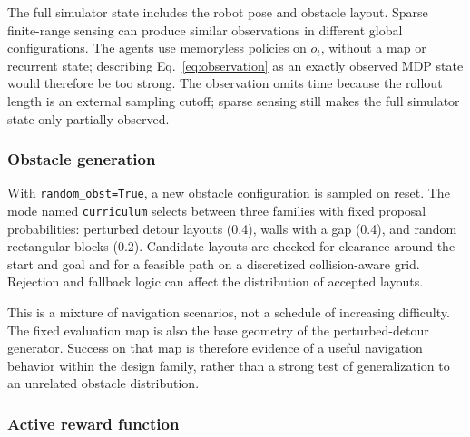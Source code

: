 \documentclass[11pt,a4paper]{article}
\theoremstyle{definition}
\theoremstyle{plain}
\theoremstyle{remark}
\newcommand{\code}[1]{\texttt{#1}}
\begin{document}
The full simulator state includes the robot pose and obstacle layout. Sparse finite-range sensing can produce similar observations in different global configurations. The agents use memoryless policies on $o_t$, without a map or recurrent state; describing Eq.~\eqref{eq:observation} as an exactly observed MDP state would therefore be too strong. The observation omits time because the rollout length is an external sampling cutoff; sparse sensing still makes the full simulator state only partially observed.

\subsubsection{Obstacle generation}

With \code{random\_obst=True}, a new obstacle configuration is sampled on reset. The mode named \code{curriculum} selects between three families with fixed proposal probabilities: perturbed detour layouts (0.4), walls with a gap (0.4), and random rectangular blocks (0.2). Candidate layouts are checked for clearance around the start and goal and for a feasible path on a discretized collision-aware grid. Rejection and fallback logic can affect the distribution of accepted layouts.

This is a mixture of navigation scenarios, not a schedule of increasing difficulty. The fixed evaluation map is also the base geometry of the perturbed-detour generator. Success on that map is therefore evidence of a useful navigation behavior within the design family, rather than a strong test of generalization to an unrelated obstacle distribution.

\subsubsection{Active reward function}
\label{sec:reward}
\end{document}

